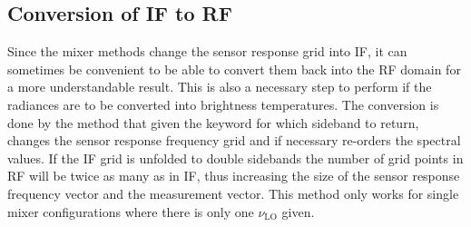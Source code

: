 \subsection{Conversion of IF to RF}
Since the mixer methods change the sensor response grid into IF, it can sometimes be convenient to be able to convert them back into the RF domain for a more understandable result. This is also a necessary step to perform if the radiances are to be converted into brightness temperatures. The conversion is done by the method  that given the keyword for which sideband to return, changes the sensor response frequency grid and if necessary re-orders the spectral values. If the IF grid is unfolded to double sidebands the number of grid points in RF will be twice as many as in IF, thus increasing the size of the sensor response frequency vector and the measurement vector. This method only works for single mixer configurations where there is only one $\nu_\mathrm{LO}$ given.



